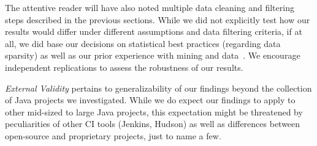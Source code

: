 The attentive reader will have also noted multiple data cleaning and filtering 
steps described in the previous sections.
While we did not explicitly test how our results would differ under different
assumptions and data filtering criteria, if at all, we did base our decisions on
statistical best practices (\eg regarding data sparsity) as well as our prior
experience with mining \GH and \Tvis data~\cite{yue2015wait, VasilescuYWDF15}.
We encourage independent replications to assess the robustness of our results.
 


\smallskip \emph{External Validity} pertains to generalizability of our findings 
beyond the collection of \GH Java projects we investigated.
While we do expect our findings to apply to other mid-sized to large Java projects,
this expectation might be threatened by peculiarities of other CI tools (\eg Jenkins, 
Hudson) as well as differences between open-source and proprietary projects, just
to name a few.

